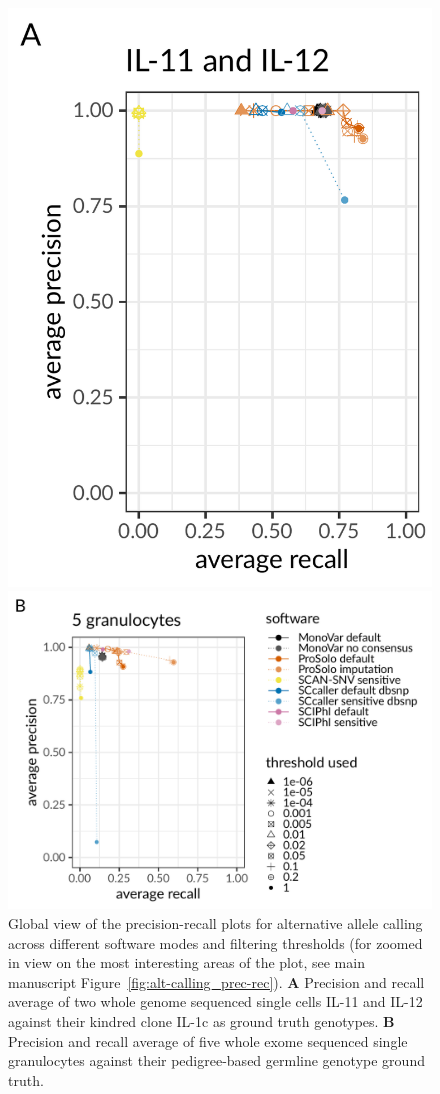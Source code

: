 \documentclass[authoryear,preprint,11pt]{scrartcl}
\begin{document}
\begin{figure}[!tpb]
 \begin{minipage}{.36\linewidth}
  \includegraphics[height=42ex]{figs/Dong2017/Dong2017_prosolo-monovar-scansnv-sccaller_precision-recall-plot.pdf} \newline
 \end{minipage}
 \begin{minipage}{.55\linewidth}
  \includegraphics[height=42ex]{figs/Laehnemann2017/Laehnemann2017_prosolo-monovar-scansnv-sccaller-sciphi_precision-recall-plot.pdf} \newline
 \end{minipage}
 \caption{
  Global view of the precision-recall plots for alternative allele calling across different software modes and filtering thresholds (for zoomed in view on the most interesting areas of the plot, see main manuscript Figure~\ref{fig:alt-calling_prec-rec}).
  \textbf{A} Precision and recall average of two whole genome sequenced single cells IL-11 and IL-12 against their kindred clone IL-1c as ground truth genotypes.
  \textbf{B} Precision and recall average of five whole exome sequenced single granulocytes against their pedigree-based germline genotype ground truth.\newline 
}
\end{figure}
\end{document}
